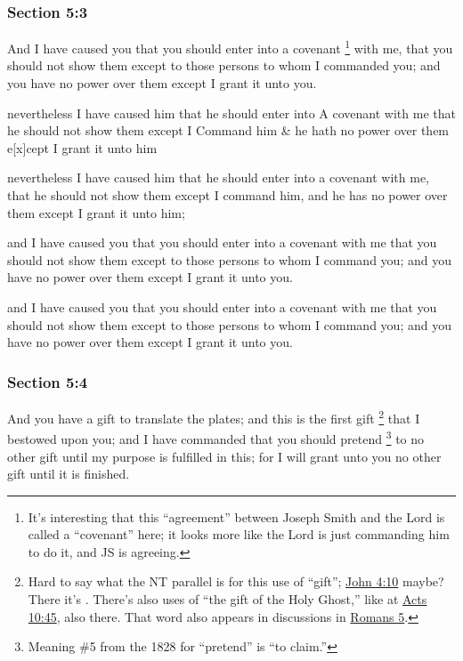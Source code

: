 	\subsubsection{Section 5:3} %
		\label{DC5-3}

		And I have caused you that you should enter into a covenant%
			\footnote{%
				It's interesting that this ``agreement'' between Joseph Smith and the Lord is called a ``covenant'' here; it looks more like the Lord is just commanding him to do it, and JS is agreeing.
				}
		with me, that you should not show them except to those persons to whom I commanded you; and you have no power over them except I grant it unto you.

		\begin{framed}
		\scriptsize
			\begin{compactdesc}
				\item[JSP] nevertheless I have caused him that he should enter into A covenant with me that he should not show them except I Command him \& he hath no power over them e[x]cept I grant it unto him
				\item[RB1] [\textit{missing}]
				\item[BC] nevertheless I have caused him that he should enter into a covenant with me, that he should not show them except I command him, and he has no power over them except I grant it unto him;
				\item[DC 1835] and I have caused you that you should enter into a covenant with me that you should not show them except to those persons to whom I command you; and you have no power over them except I grant it unto you.
				\item[DC 1844] and I have caused you that you should enter into a covenant with me that you should not show them except to those persons to whom I command you; and you have no power over them except I grant it unto you.
			\end{compactdesc}
		\end{framed}

	\subsubsection{Section 5:4} %
		\label{DC5-4}

		And you have a gift to translate the plates; and this is the first gift%
			\footnote{%
				Hard to say what the NT parallel is for this use of ``gift''; \hyperref[JOHN-4-10]{John 4:10} maybe? There it's . There's also uses of ``the gift of the Holy Ghost,'' like at \hyperref[ACTS-10-45]{Acts 10:45}, also  there. That word also appears in discussions in \hyperref[ROMANS-5]{Romans 5}.
				}
		that I bestowed upon you; and I have commanded that you should pretend%
			\footnote{%
				Meaning \#5 from the 1828 for ``pretend'' is ``to claim.'' 
				}
		to no other gift until my purpose is fulfilled in this; for I will grant unto you no other gift until it is finished.

